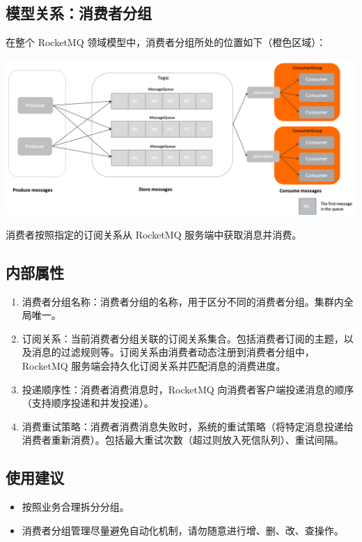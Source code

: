 \documentclass[11pt, a4paper, oneside, fontset=none]{ctexbook}
\begin{document}
\subsection{模型关系：消费者分组}
在整个 RocketMQ 领域模型中，消费者分组所处的位置如下（橙色区域）：

\begin{center}
  \begin{minipage}{\textwidth}
    \center
    \includegraphics[width=\textwidth]{picture/模型关系：消费者分组.png}
    \captionsetup{hypcap=false}
    \label{fig:模型关系：消费者分组}
  \end{minipage}
\end{center}

消费者按照指定的订阅关系从 RocketMQ 服务端中获取消息并消费。

\subsection{内部属性}
\begin{enumerate}
  \item 消费者分组名称：消费者分组的名称，用于区分不同的消费者分组。集群内全局唯一。
  \item 订阅关系：当前消费者分组关联的订阅关系集合。包括消费者订阅的主题，以及消息的过滤规则等。订阅关系由消费者动态注册到消费者分组中，RocketMQ 服务端会持久化订阅关系并匹配消息的消费进度。
  \item 投递顺序性：消费者消费消息时，RocketMQ 向消费者客户端投递消息的顺序（支持顺序投递和并发投递）。
  \item 消费重试策略：消费者消费消息失败时，系统的重试策略（将特定消息投递给消费者重新消费）。包括最大重试次数（超过则放入死信队列）、重试间隔。
\end{enumerate}

\subsection{使用建议}
\begin{itemize}
  \item 按照业务合理拆分分组。
  \item 消费者分组管理尽量避免自动化机制，请勿随意进行增、删、改、查操作。
\end{itemize}
\end{document}
